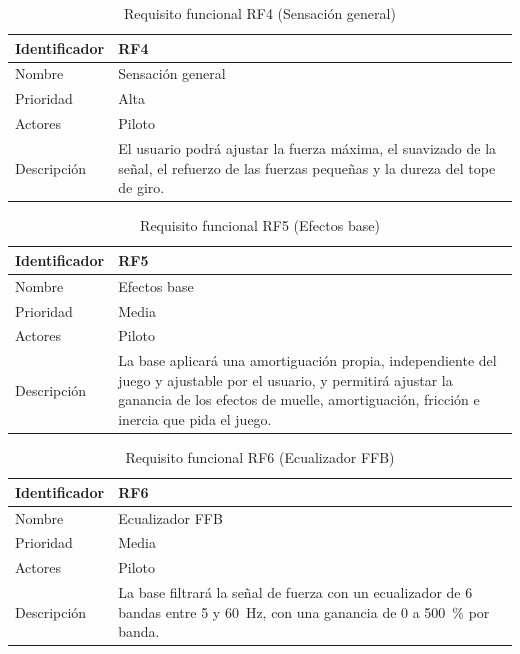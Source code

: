 \begin{table}[H]
	\centering
	\renewcommand{\arraystretch}{2}
	\begin{tabular}{|l|p{10cm}|}
		\hline
		Identificador & RF4 \\
		\hline
		Nombre & Sensación general \\
		\hline
		Prioridad & Alta \\
		\hline
		Actores & Piloto \\
		\hline
		Descripción & El usuario podrá ajustar la fuerza máxima, el suavizado de la señal, el refuerzo de las fuerzas pequeñas y la dureza del tope de giro. \\
		\hline
	\end{tabular}
	\caption{Requisito funcional RF4 (Sensación general)}
	\label{tab:rf4}
\end{table}

\begin{table}[H]
	\centering
	\renewcommand{\arraystretch}{2}
	\begin{tabular}{|l|p{10cm}|}
		\hline
		Identificador & RF5 \\
		\hline
		Nombre & Efectos base \\
		\hline
		Prioridad & Media \\
		\hline
		Actores & Piloto \\
		\hline
		Descripción & La base aplicará una amortiguación propia, independiente del juego y ajustable por el usuario, y permitirá ajustar la ganancia de los efectos de muelle, amortiguación, fricción e inercia que pida el juego. \\
		\hline
	\end{tabular}
	\caption{Requisito funcional RF5 (Efectos base)}
	\label{tab:rf5}
\end{table}

\begin{table}[H]
	\centering
	\renewcommand{\arraystretch}{2}
	\begin{tabular}{|l|p{10cm}|}
		\hline
		Identificador & RF6 \\
		\hline
		Nombre & Ecualizador FFB \\
		\hline
		Prioridad & Media \\
		\hline
		Actores & Piloto \\
		\hline
		Descripción & La base filtrará la señal de fuerza con un ecualizador de 6 bandas entre 5 y 60~Hz, con una ganancia de 0 a 500~\% por banda. \\
		\hline
	\end{tabular}
	\caption{Requisito funcional RF6 (Ecualizador FFB)}
	\label{tab:rf6}
\end{table}

